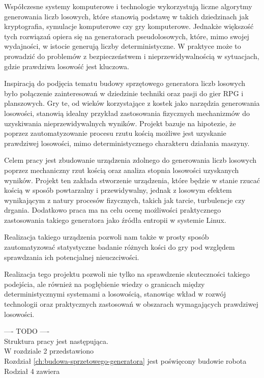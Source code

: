 Współczesne systemy komputerowe i technologie wykorzystują liczne algorytmy generowania liczb losowych, które stanowią podstawę w takich dziedzinach jak kryptografia,
symulacje komputerowe czy gry komputerowe.
Jednakże większość tych rozwiązań opiera się na generatorach pseudolosowych,
które, mimo swojej wydajności, w istocie generują liczby deterministyczne.
W praktyce może to prowadzić do problemów z bezpieczeństwem i nieprzewidywalnością w sytuacjach, gdzie prawdziwa losowość jest kluczowa.

Inspiracją do podjęcia tematu budowy sprzętowego generatora liczb losowych było połączenie zainteresowań w dziedzinie techniki oraz pasji do gier RPG i planszowych.
Gry te, od wieków korzystające z kostek jako narzędzia generowania losowości, stanowią idealny przykład zastosowania fizycznych mechanizmów do uzyskiwania nieprzewidywalnych wyników.
Projekt bazuje na hipotezie, że poprzez zautomatyzowanie procesu rzutu kością możliwe jest uzyskanie prawdziwej losowości, mimo deterministycznego charakteru działania maszyny.

Celem pracy jest zbudowanie urządzenia zdolnego do generowania liczb losowych poprzez mechaniczny rzut kością oraz analiza stopnia losowości uzyskanych wyników.
Projekt ten zakłada stworzenie urządzenia, które będzie w stanie rzucać kością w sposób powtarzalny i przewidywalny,
jednak z losowym efektem wynikającym z natury procesów fizycznych, takich jak tarcie, turbulencje czy drgania.
Dodatkowo praca ma na celu ocenę możliwości praktycznego zastosowania takiego generatora jako źródła entropii w systemie Linux.

Realizacja takiego urządzenia pozwoli nam także w prosty sposób zautomatyzować statystyczne badanie różnych kości do gry pod względem sprawdzania ich potencjalnej nieuczciwości.

Realizacja tego projektu pozwoli nie tylko na sprawdzenie skuteczności takiego podejścia,
ale również na pogłębienie wiedzy o granicach między deterministycznymi systemami a losowością,
stanowiąc wkład w rozwój technologii oraz praktycznych zastosowań w obszarach wymagających prawdziwej losowości.


---- TODO ---- \\
Struktura pracy jest następująca. \\
W rozdziale 2 przedstawiono \\
Rozdział \ref{ch:budowa-sprzetowego-generatora} jest poświęcony budowie robota\\
Rodział 4 zawiera \\


